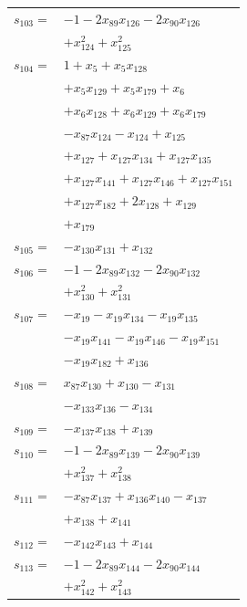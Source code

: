 \begin{longtable}{@{}r@{\;}l@{}}
\(s_{103}=\) & \(\displaystyle -1 -2x_{89}x_{126} -2x_{90}x_{126}\) \\
 & \(\displaystyle +x_{124}^{2} +x_{125}^{2}\) \\[3pt]
\(s_{104}=\) & \(\displaystyle 1 +x_{5} +x_{5}x_{128}\) \\
 & \(\displaystyle +x_{5}x_{129} +x_{5}x_{179} +x_{6}\) \\
 & \(\displaystyle +x_{6}x_{128} +x_{6}x_{129} +x_{6}x_{179}\) \\
 & \(\displaystyle -x_{87}x_{124} -x_{124} +x_{125}\) \\
 & \(\displaystyle +x_{127} +x_{127}x_{134} +x_{127}x_{135}\) \\
 & \(\displaystyle +x_{127}x_{141} +x_{127}x_{146} +x_{127}x_{151}\) \\
 & \(\displaystyle +x_{127}x_{182} +2x_{128} +x_{129}\) \\
 & \(\displaystyle +x_{179}\) \\[3pt]
\(s_{105}=\) & \(\displaystyle -x_{130}x_{131} +x_{132}\) \\[3pt]
\(s_{106}=\) & \(\displaystyle -1 -2x_{89}x_{132} -2x_{90}x_{132}\) \\
 & \(\displaystyle +x_{130}^{2} +x_{131}^{2}\) \\[3pt]
\(s_{107}=\) & \(\displaystyle -x_{19} -x_{19}x_{134} -x_{19}x_{135}\) \\
 & \(\displaystyle -x_{19}x_{141} -x_{19}x_{146} -x_{19}x_{151}\) \\
 & \(\displaystyle -x_{19}x_{182} +x_{136}\) \\[3pt]
\(s_{108}=\) & \(\displaystyle x_{87}x_{130} +x_{130} -x_{131}\) \\
 & \(\displaystyle -x_{133}x_{136} -x_{134}\) \\[3pt]
\(s_{109}=\) & \(\displaystyle -x_{137}x_{138} +x_{139}\) \\[3pt]
\(s_{110}=\) & \(\displaystyle -1 -2x_{89}x_{139} -2x_{90}x_{139}\) \\
 & \(\displaystyle +x_{137}^{2} +x_{138}^{2}\) \\[3pt]
\(s_{111}=\) & \(\displaystyle -x_{87}x_{137} +x_{136}x_{140} -x_{137}\) \\
 & \(\displaystyle +x_{138} +x_{141}\) \\[3pt]
\(s_{112}=\) & \(\displaystyle -x_{142}x_{143} +x_{144}\) \\[3pt]
\(s_{113}=\) & \(\displaystyle -1 -2x_{89}x_{144} -2x_{90}x_{144}\) \\
 & \(\displaystyle +x_{142}^{2} +x_{143}^{2}\) \\[3pt]

\end{longtable}
